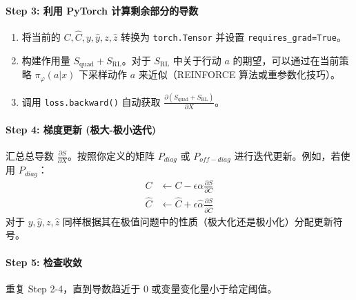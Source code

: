 \documentclass[UTF8]{ctexart}
\begin{document}
\paragraph{Step 3: 利用 PyTorch 计算剩余部分的导数}
\begin{enumerate}
    \item 将当前的 $C, \hat{C}, y, \hat{y}, z, \hat{z}$ 转换为 \texttt{torch.Tensor} 并设置 \texttt{requires\_grad=True}。
    \item 构建作用量 $S_{\text{quad}} + S_{\text{RL}}$。对于 $S_{\text{RL}}$ 中关于行动 $a$ 的期望，可以通过在当前策略 $\pi_\varphi(a|x)$ 下采样动作 $a$ 来近似（REINFORCE 算法或重参数化技巧）。
    \item 调用 \texttt{loss.backward()} 自动获取 $\frac{\partial (S_{\text{quad}} + S_{\text{RL}})}{\partial X}$。
\end{enumerate}

\paragraph{Step 4: 梯度更新 (极大-极小迭代)}
汇总总导数 $\frac{\partial S}{\partial X}$。按照你定义的矩阵 $P_{diag}$ 或 $P_{off-diag}$ 进行迭代更新。例如，若使用 $P_{diag}$：
\begin{align}
    C &\leftarrow C - \epsilon \alpha \frac{\partial S}{\partial C} \\
    \hat{C} &\leftarrow \hat{C} + \epsilon \hat{\alpha} \frac{\partial S}{\partial \hat{C}}
\end{align}
对于 $y, \hat{y}, z, \hat{z}$ 同样根据其在极值问题中的性质（极大化还是极小化）分配更新符号。

\paragraph{Step 5: 检查收敛}
重复 Step 2-4，直到导数趋近于 0 或变量变化量小于给定阈值。
    
\end{document}
